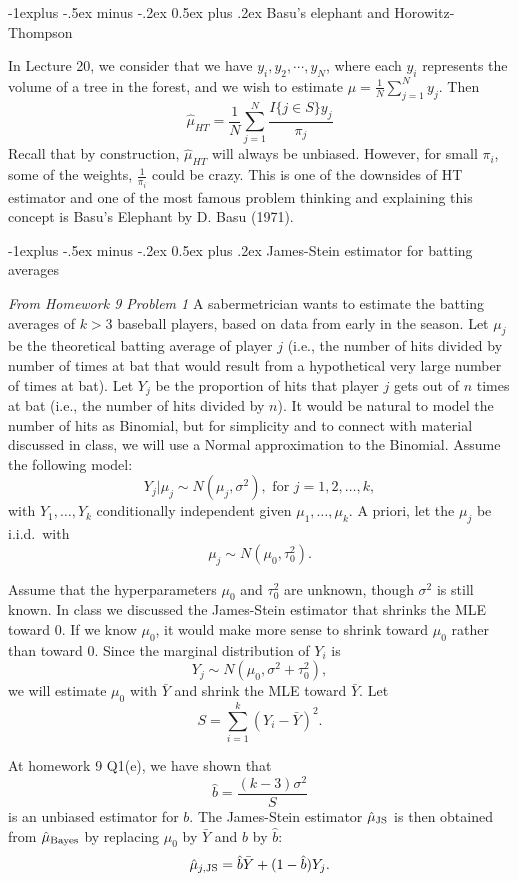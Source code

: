 \documentclass[10pt,landscape]{article}
\makeatletter
\renewcommand{\subsection}{\@startsection{subsection}{2}{0mm}%
                                {-1explus -.5ex minus -.2ex}%
                                {0.5ex plus .2ex}%
                                {\normalfont\normalsize\bfseries}}
\makeatother
\begin{document}
\begin{multicols*}{3}
\subsection{Basu's elephant and Horowitz-Thompson}

In Lecture 20, we consider that we have $y_i, y_2, \cdots, y_N$, where each $y_i$ represents the volume of a tree in the forest, and we wish to estimate $\mu=\frac{1}{N}\sum_{j=1}^N y_j$. Then $$\hat{\mu}_{HT} =\frac{1}{N} \sum_{j=1}^N \frac{I\{j \in S\}y_j}{\pi_j}$$
Recall that by construction, $\hat{\mu}_{HT}$ will always be unbiased. However, for small $\pi_i$, some of the weights, $\frac{1}{\pi_i}$ could be crazy. This is one of the downsides of HT estimator and one of the most famous problem thinking and explaining this concept is Basu's Elephant by D. Basu (1971).



\subsection{ James-Stein estimator for batting averages}

\textit{From Homework 9 Problem 1}
 A sabermetrician wants to estimate the batting averages of $k > 3$ baseball players, based on data from early in the season. Let $\mu_j$ be the theoretical batting average of player $j$ (i.e., the number of hits divided by number of times at bat that would result from a hypothetical very large number of times at bat).  Let $Y_j$ be the proportion of hits that player $j$ gets out of $n$ times at bat (i.e., the number of hits divided by $n$). It would be natural to model the number of hits as Binomial, but for simplicity and to connect with material discussed in class, we will use a Normal approximation to the Binomial. Assume the following model:
$$Y_j | \mu_j \sim N(\mu_j,\sigma^2), \text{ for } j = 1,2, \dots, k,$$
with $Y_1,\dots,Y_k$ conditionally independent given $\mu_1,\dots,\mu_k$. A priori, let the $\mu_j$ be i.i.d.~with
$$\mu_j \sim N(\mu_0,\tau^2_0).$$


Assume that the hyperparameters $\mu_0$ and $\tau^2_0$ are unknown, though $\sigma^2$ is still known. In class we discussed the James-Stein estimator that shrinks the MLE toward $0$. If we know $\mu_0$, it would make more sense to shrink toward $\mu_0$ rather than toward $0$. Since the marginal distribution of $Y_i$ is
$$Y_j \sim N(\mu_0, \sigma^2 + \tau^2_0),$$
we will estimate  $\mu_0$  with $\bar{Y}$ and shrink the MLE toward $\bar{Y}$. Let
$$S = \sum_{i=1}^k (Y_i - \bar{Y})^2.$$

At homework 9 Q1(e), we have shown that
$$\hat{b} = \frac{(k-3)\sigma^2}{S}$$
is an unbiased estimator for $b$. The James-Stein estimator $\hat{\mu}_{\textnormal{JS}}$ is then obtained from $\hat{\mu}_{\textnormal{Bayes}}$ by replacing $\mu_0$ by $\bar{Y}$ and $b$ by $\hat{b}$:
$$\hat{\mu}_{j, \textnormal{JS}} = \hat{b} \bar{Y} + (1 - \hat{b}) Y_j.$$

\end{multicols*}
\end{document}
